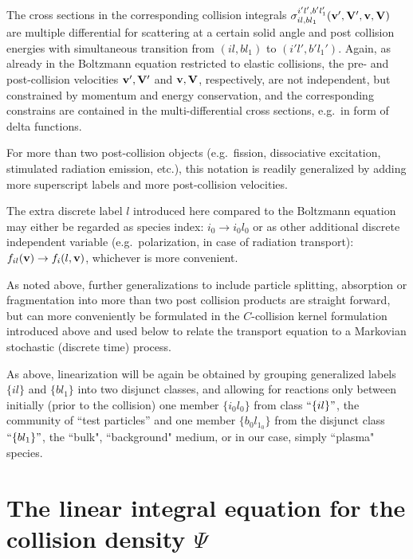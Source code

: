 The cross sections in the corresponding collision integrals
$\sigma_{il,bl_1}^{i'l',b'l_1'}(\mathbf{v}',\mathbf{V}',\mathbf{v},\mathbf{V})$ are multiple differential
for scattering at a certain solid angle and post collision energies with
simultaneous transition from $(il, bl_1)$ to $(i'l',b'l_1')$.
Again, as already in the Boltzmann equation restricted to elastic collisions,
the pre- and post-collision velocities $\mathbf{v}',\mathbf{V}'$ and $\mathbf{v},\mathbf{V}$, respectively,
are not independent, but constrained by momentum and energy conservation, and
the corresponding constrains are contained in the multi-differential cross
sections, e.g.\ in form of delta functions.

For more than two post-collision objects (e.g.\ fission, dissociative
excitation, stimulated radiation emission, etc.), this notation is readily
generalized by adding more superscript labels and more post-collision
velocities.

The extra discrete label $l$ introduced here compared to the Boltzmann equation
may either be regarded as species index:
$i_0 \rightarrow i_0l_0$ or as other additional discrete independent variable
(e.g.\ polarization, in case of radiation transport):
$f_{il}(\mathbf{v}) \rightarrow f_{i}(l,\mathbf{v})$, whichever is more convenient.

As noted above, further generalizations to include particle splitting,
absorption or fragmentation into more than two post collision products are
straight forward, but can more conveniently be formulated in the $C$-collision
kernel formulation introduced above and used below to relate the transport
equation to a Markovian stochastic (discrete time) process.


\vspace{1em}

As above, linearization will be again be obtained by grouping generalized
labels $\{il\}$ and $\{bl_1\}$ into two disjunct classes, and allowing for
reactions only between initially (prior to the collision) one member
$\{i_0l_0\}$ from class $``\{il\}"$, the community of ``test particles'' and
one member $\{b_0l_{1_0}\}$ from the disjunct class $``\{bl_1\}"$, the ``bulk",
``background" medium, or in our case, simply ``plasma" species.

\section{The linear integral equation for the collision density
  \texorpdfstring{$\Psi$}{psi}} \label{sec1.1}

